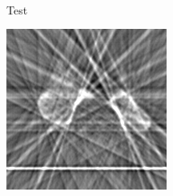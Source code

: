 \documentclass[journal]{IEEEtran}
\begin{document}
\begin{figure}[!h]
{\begin{subfigure}[b]{0.155\linewidth}
        \caption{}
     \end{subfigure}}\\
\begin{subfigure}[b]{0.235\linewidth}
        \caption{Test}
\end{subfigure}
\quad
    \begin{subfigure}[b]{0.23\linewidth}
        \includegraphics[width=\textwidth]{../images/humerus/fbp_humerus.png}

\end{subfigure}
\end{figure}
\end{document}

